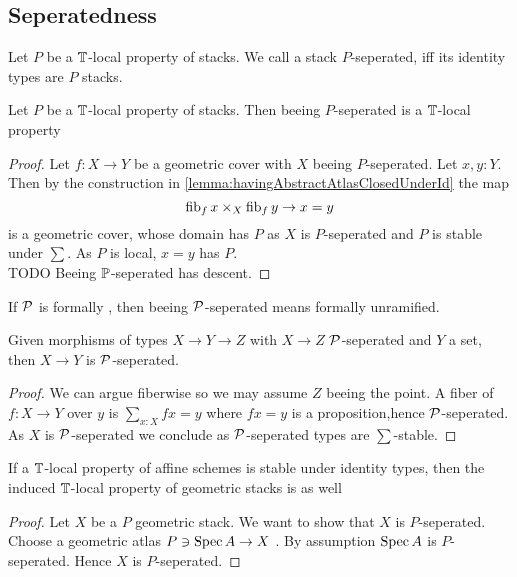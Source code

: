 \subsection{Seperatedness}
\begin{definition}
Let $P$ be a $\mathbb{T}$-local property of stacks.
We call a stack $P$-seperated, iff its identity types are $P$ stacks.
\end{definition}

\begin{lemma}{\label{lemma:SeperationIsLocal}}
	Let $P$ be a $\mathbb{T}$-local property of stacks. Then beeing $P$-seperated is a $\mathbb{T}$-local property %
\end{lemma}
\begin{proof}
	Let $f : X \to Y$ be a geometric cover with $X$ beeing $P$-seperated. Let $x , y : Y$. Then by the construction in \ref{lemma:havingAbstractAtlasClosedUnderId} the map
	\[
	\operatorname{fib}_f x \times_X \operatorname{fib}_f y \to x = y
	\]
	is a geometric cover, whose domain has $P$ as $X$ is $P$-seperated and $P$ is stable under $\sum$. As $P$ is local, $x = y$ has $P$. \\
	TODO Beeing $\mathbb{P}$-seperated has descent.
\end{proof}

\begin{example}
	If $\mathcal{P}$ is formally \etale, then beeing $\mathcal{P}$-seperated means formally unramified.
\end{example}
\begin{lemma}{\label{lemma:SetUnramfied}}
	Given morphisms of types $X \to Y \to Z$ with $X \to Z$ $\mathcal{P}$-seperated and $Y$ a set, then $X \to Y$ is $\mathcal{P}$-seperated.
\end{lemma}
\begin{proof}
	We can argue fiberwise so we may assume $Z$ beeing the point. A fiber of $f : X \to Y$ over $y$ is $\sum_{x: X} f x = y$ where $f x = y$ is a proposition,hence $\mathcal{P}$-seperated. As $X$ is $\mathcal{P}$-seperated we conclude as $\mathcal{P}$-seperated types are $\sum$-stable.
\end{proof}

\begin{lemma}{\label{lemma:PImpliesPsep}}
	If a $\mathbb{T}$-local property of affine schemes is stable under identity types, then the induced $\mathbb{T}$-local property of geometric stacks is as well
\end{lemma}
\begin{proof}
	Let $X$ be a $P$ geometric stack. We want to show that $X$ is $P$-seperated. Choose a geometric atlas $P \ni \operatorname{Spec} A \to X$ . By assumption $\operatorname{Spec} A$ is $P$-seperated. Hence $X$ is $P$-seperated.
\end{proof}